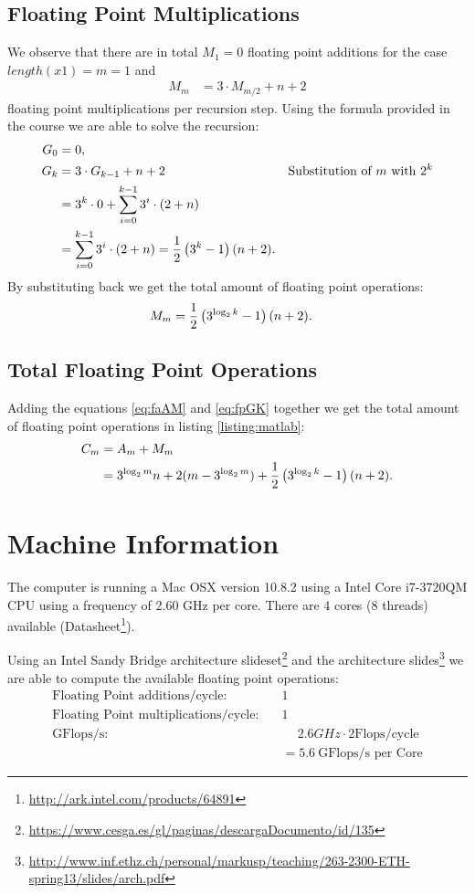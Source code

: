 \documentclass[portrait,a4paper]{article}
\begin{document}
\subsection{Floating Point Multiplications}
We observe that there are in total $M_1=0$ floating point additions for the case $length(x1)=m=1$ and 
\begin{align}
    M_m &= 3\cdot M_{m/2}+n+2
\end{align}
floating point multiplications per recursion step. Using the formula provided in the course we are able to solve the recursion:
\begin{align}
    G_0 &= 0,\\
    G_k &= 3\cdot G_{k-1} + n + 2&\text{Substitution of $m$ with $2^k$}\nonumber\\
        &= 3^k\cdot 0 + \sum_{i=0}^{k-1} 3^i\cdot (2+n)\nonumber\\
        &= \sum_{i=0}^{k-1} 3^i\cdot (2+n) = {1\over 2}\left(3^k-1\right)(n+2).\label{eq:fpGK}
\end{align}
By substituting back we get the total amount of floating point operations:
\begin{align}
    M_m &= {1\over 2}\left(3^{\log_2{k}}-1\right)(n+2).
\end{align}

\subsection{Total Floating Point Operations}
Adding the equations \eqref{eq:faAM} and \eqref{eq:fpGK} together we get the total amount of floating point operations in listing \ref{listing:matlab}:
\begin{align}
    C_m &=A_m+M_m \nonumber\\
     &= 3^{\log_2{m}}n + 2(m-3^{\log_2{m}}) + {1\over 2}\left(3^{\log_2{k}}-1\right)(n+2).
\end{align}

\section{Machine Information}

The computer is running a Mac OSX version 10.8.2 using a Intel Core i7-3720QM CPU using a frequency of 2.60 GHz per core. There are 4 cores (8 threads) available (Datasheet\footnote{\url{http://ark.intel.com/products/64891}}). 

Using an Intel Sandy Bridge architecture slideset\footnote{\url{https://www.cesga.es/gl/paginas/descargaDocumento/id/135}} and the architecture slides\footnote{\url{http://www.inf.ethz.ch/personal/markusp/teaching/263-2300-ETH-spring13/slides/arch.pdf}} we are able to compute the available floating point operations:
\begin{align}
    \text{Floating Point additions/cycle:}\quad &1\nonumber\\
    \text{Floating Point multiplications/cycle:}\quad &1\nonumber\\
    \text{GFlops/s:}\quad &\quad\ 2.6GHz \cdot 2 \text{Flops/cycle} \nonumber\\&= 5.6\ \text{GFlops/s per Core}\nonumber
\end{align}
\end{document}
